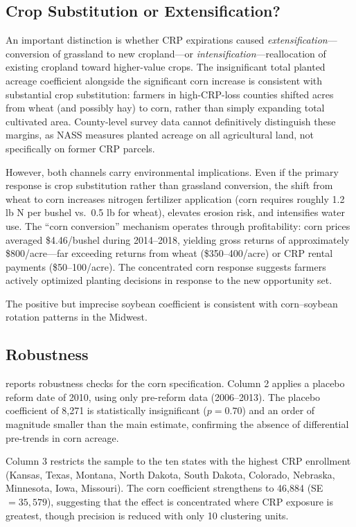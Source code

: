 \documentclass[12pt]{article}
\begin{document}
\subsection{Crop Substitution or Extensification?}

An important distinction is whether CRP expirations caused \emph{extensification}---conversion of grassland to new cropland---or \emph{intensification}---reallocation of existing cropland toward higher-value crops. The insignificant total planted acreage coefficient alongside the significant corn increase is consistent with substantial crop substitution: farmers in high-CRP-loss counties shifted acres from wheat (and possibly hay) to corn, rather than simply expanding total cultivated area. County-level survey data cannot definitively distinguish these margins, as NASS measures planted acreage on all agricultural land, not specifically on former CRP parcels.

However, both channels carry environmental implications. Even if the primary response is crop substitution rather than grassland conversion, the shift from wheat to corn increases nitrogen fertilizer application (corn requires roughly 1.2 lb N per bushel vs.\ 0.5 lb for wheat), elevates erosion risk, and intensifies water use. The ``corn conversion'' mechanism operates through profitability: corn prices averaged \$4.46/bushel during 2014--2018, yielding gross returns of approximately \$800/acre---far exceeding returns from wheat (\$350--400/acre) or CRP rental payments (\$50--100/acre). The concentrated corn response suggests farmers actively optimized planting decisions in response to the new opportunity set.

The positive but imprecise soybean coefficient is consistent with corn--soybean rotation patterns in the Midwest.

\subsection{Robustness}



 reports robustness checks for the corn specification. Column 2 applies a placebo reform date of 2010, using only pre-reform data (2006--2013). The placebo coefficient of 8,271 is statistically insignificant ($p = 0.70$) and an order of magnitude smaller than the main estimate, confirming the absence of differential pre-trends in corn acreage.

Column 3 restricts the sample to the ten states with the highest CRP enrollment (Kansas, Texas, Montana, North Dakota, South Dakota, Colorado, Nebraska, Minnesota, Iowa, Missouri). The corn coefficient strengthens to 46,884 (SE $= 35{,}579$), suggesting that the effect is concentrated where CRP exposure is greatest, though precision is reduced with only 10 clustering units.
\end{document}
